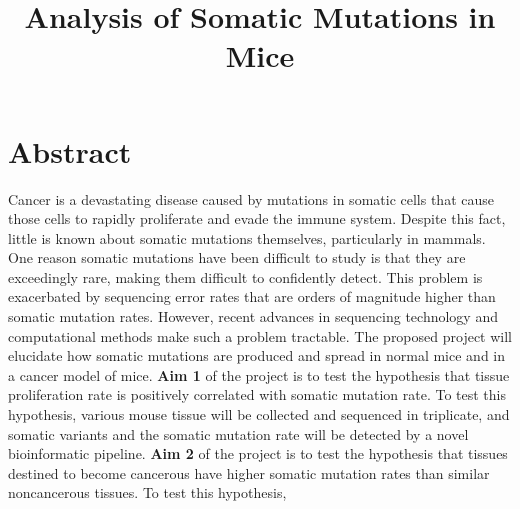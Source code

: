 \documentclass[12pt]{article}
\title{Analysis of Somatic Mutations in Mice}
\date{}
\begin{document}
\maketitle





\section{Abstract}

Cancer is a devastating disease caused by mutations in somatic cells that cause those cells to rapidly proliferate and evade the immune system.
Despite this fact, little is known about somatic mutations themselves, particularly in mammals.
One reason somatic mutations have been difficult to study is that they are exceedingly rare, making them difficult to confidently detect.
This problem is exacerbated by sequencing error rates that are orders of magnitude higher than somatic mutation rates.
However, recent advances in sequencing technology and computational methods make such a problem tractable.
The proposed project will elucidate how somatic mutations are produced and spread in normal mice and in a cancer model of mice.
\textbf{Aim 1} of the project is to test the hypothesis that tissue proliferation rate is positively correlated with somatic mutation rate.
To test this hypothesis, various mouse tissue will be collected and sequenced in triplicate, and somatic variants and the somatic mutation rate will be detected by a novel bioinformatic pipeline. 
\textbf{Aim 2} of the project is to test the hypothesis that tissues destined to become cancerous have higher somatic mutation rates than similar noncancerous tissues.
To test this hypothesis, 
\end{document}
